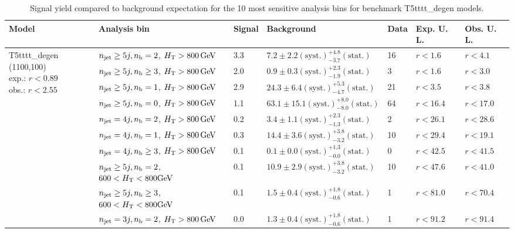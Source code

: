 \begin{table}[h!] 
  \scriptsize
  \caption{ 
Signal yield compared to background expectation for the 10 most sensitive analysis bins 
for benchmark T5tttt\_degen models.
  \label{tab:sigBenchmarksYields_T5tttt_degen}}
  \centering 
  \begin{tabular}{ lllllll } 
    \hline 
    \hline 
    Model & Analysis bin & Signal & Background & Data & Exp. U. L. & Obs. U. L. \\ \hline
\multirow{10}{*}{\parbox[t]{2cm}{T5tttt\_degen (1100,100)\\exp.: $r<0.89$\\obs.: $r<2.55$}}
 & $n_{\mathrm{jet}} \geq5j,n_{\text{b}} =2$, $\mbox{$H_\text{T}$} > 800 \, \mathrm{GeV}$ & 3.3 & $7.2 \pm 2.2 \mathrm{(syst.)} ^{+4.8}_{-3.7} \mathrm{(stat.)}$ & 16 & $r < 1.6$ & $r < 4.1$\\ 
 & $n_{\mathrm{jet}} \geq5j,n_{\text{b}} \geq3$, $\mbox{$H_\text{T}$} > 800 \, \mathrm{GeV}$ & 2.0 & $0.9 \pm 0.3 \mathrm{(syst.)} ^{+2.3}_{-1.9} \mathrm{(stat.)}$ & 3 & $r < 1.6$ & $r < 3.0$\\ 
 & $n_{\mathrm{jet}} \geq5j,n_{\text{b}} =1$, $\mbox{$H_\text{T}$} > 800 \, \mathrm{GeV}$ & 2.9 & $24.3 \pm 6.4 \mathrm{(syst.)} ^{+5.3}_{-4.7} \mathrm{(stat.)}$ & 21 & $r < 3.5$ & $r < 3.8$\\ 
 & $n_{\mathrm{jet}} \geq5j,n_{\text{b}} =0$, $\mbox{$H_\text{T}$} > 800 \, \mathrm{GeV}$ & 1.1 & $63.1 \pm 15.1 \mathrm{(syst.)} ^{+8.0}_{-8.0} \mathrm{(stat.)}$ & 64 & $r < 16.4$ & $r < 17.0$\\ 
 & $n_{\mathrm{jet}} =4j,n_{\text{b}} =2$, $\mbox{$H_\text{T}$} > 800 \, \mathrm{GeV}$ & 0.2 & $3.4 \pm 1.1 \mathrm{(syst.)} ^{+2.3}_{-1.3} \mathrm{(stat.)}$ & 2 & $r < 26.1$ & $r < 28.6$\\ 
 & $n_{\mathrm{jet}} =4j,n_{\text{b}} =1$, $\mbox{$H_\text{T}$} > 800 \, \mathrm{GeV}$ & 0.3 & $14.4 \pm 3.6 \mathrm{(syst.)} ^{+3.8}_{-3.2} \mathrm{(stat.)}$ & 10 & $r < 29.4$ & $r < 19.1$\\ 
 & $n_{\mathrm{jet}} =4j,n_{\text{b}} \geq3$, $\mbox{$H_\text{T}$} > 800 \, \mathrm{GeV}$ & 0.1 & $0.1 \pm 0.0 \mathrm{(syst.)} ^{+1.3}_{-0.0} \mathrm{(stat.)}$ & 0 & $r < 42.5$ & $r < 41.5$\\ 
 & $n_{\mathrm{jet}} \geq5j,n_{\text{b}} =2$, $600 < \mbox{$H_\text{T}$} < 800 \mathrm{GeV}$ & 0.1 & $10.9 \pm 2.9 \mathrm{(syst.)} ^{+3.8}_{-3.2} \mathrm{(stat.)}$ & 10 & $r < 47.6$ & $r < 41.0$\\ 
 & $n_{\mathrm{jet}} \geq5j,n_{\text{b}} \geq3$, $600 < \mbox{$H_\text{T}$} < 800 \mathrm{GeV}$ & 0.1 & $1.5 \pm 0.4 \mathrm{(syst.)} ^{+1.8}_{-0.6} \mathrm{(stat.)}$ & 1 & $r < 81.0$ & $r < 70.4$\\ 
 & $n_{\mathrm{jet}} =3j,n_{\text{b}} =2$, $\mbox{$H_\text{T}$} > 800 \, \mathrm{GeV}$ & 0.0 & $1.3 \pm 0.4 \mathrm{(syst.)} ^{+1.8}_{-0.6} \mathrm{(stat.)}$ & 1 & $r < 91.2$ & $r < 91.4$\\ \hline

\end{tabular}
\end{table}
